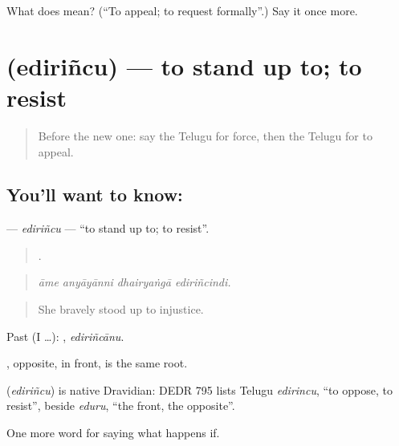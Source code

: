 \begin{tcolorbox}[breakable,colback=teal!4,colframe=teal!35!black,title={Before you move on}]
What does  mean? (\textquotedblleft{}To appeal; to request formally\textquotedblright{}.) Say it once more.
\end{tcolorbox}
\section[\texorpdfstring{\te{ఎదిరించు} (ediriñcu)}{ఎదిరించు (ediriñcu)}]{ (ediriñcu) — to stand up to; to resist}

\label{lesson:TE-C424-edirincu}



\begin{quote}
Before the new one: say the Telugu for force, then the Telugu for to appeal.
\end{quote}

\subsection*{You'll want to know: }
\textbf{} — \emph{ediriñcu} — \textquotedblleft{}to stand up to; to resist\textquotedblright{}.

\begin{quote}
   .
\end{quote}

\begin{quote}
\emph{āme anyāyānni dhairyaṅgā ediriñcindi.}
\end{quote}

\begin{quote}
She bravely stood up to injustice.
\end{quote}

Past (I …): , \emph{ediriñcānu}.

, opposite, in front, is the same root.

\begin{cousinweb}
\textbf{} (\emph{ediriñcu}) is native Dravidian: DEDR 795 lists Telugu \emph{edirincu}, \textquotedblleft{}to oppose, to resist\textquotedblright{}, beside \emph{eduru}, \textquotedblleft{}the front, the opposite\textquotedblright{}.
\end{cousinweb}

\begin{grammarlens}[title={What you've built}]
One more word for saying what happens if.
\end{grammarlens}

